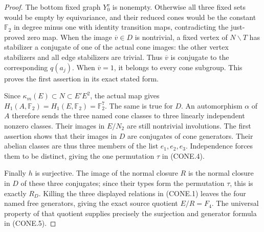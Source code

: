 \begin{proof}
The bottom fixed graph $Y_0^v$ is nonempty.  Otherwise all three
fixed sets would be empty by equivariance, and their reduced cones
would be the constant $\mathbb F_2$ in degree minus one with
identity transition maps, contradicting the just-proved zero map.
When the image $\overline v\in D$ is nontrivial, a fixed vertex of
$N\backslash T$ has stabilizer a conjugate of one of the actual
cone images: the other vertex stabilizers and all edge stabilizers
are trivial.  Thus $\overline v$ is conjugate to the corresponding
$q(a_j)$.  When $\overline v=1$, it belongs to every cone subgroup.
This proves the first assertion in its exact stated form.

Since $\kappa_m(E)\subset N\subset E'E^2$, the actual map gives
$H_1(A,\mathbb F_2)=H_1(E,\mathbb F_2)=\mathbb F_2^7$.
The same is true for $D$.  An automorphism $\alpha$ of $A$ therefore
sends the three named cone classes to three linearly independent
nonzero classes.  Their images in $E/N_2$ are still nontrivial
involutions.  The first assertion shows that their images in $D$
are conjugates of cone generators.  Their abelian classes are thus
three members of the list $e_1,e_2,e_3$.  Independence forces them
to be distinct, giving the one permutation $\tau$ in (CONE.4).

Finally $h$ is surjective.  The image of the normal closure $R$
is the normal closure in $D$ of these three conjugates; since their
types form the permutation $\tau$, this is exactly $R_D$.
Killing the three displayed relations in (CONE.1) leaves the four
named free generators, giving the exact source quotient $E/R=F_4$.
The universal property of that quotient supplies precisely the
surjection and generator formula in (CONE.5).
\end{proof}
